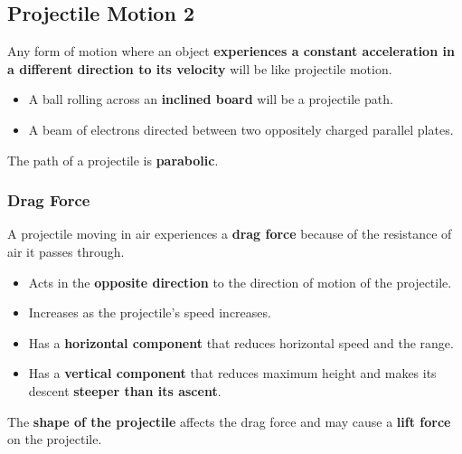 \subsection{Projectile Motion 2}

Any form of motion where an object \textbf{experiences a constant acceleration in a different direction to its velocity} will be like projectile motion.

\begin{itemize}
    \item A ball rolling across an \textbf{inclined board} will be a projectile path.
    \item A beam of electrons directed between two oppositely charged parallel plates.
\end{itemize}

The path of a projectile is \textbf{parabolic}.

\subsubsection*{Drag Force}

A projectile moving in air experiences a \textbf{drag force} because of the resistance of air it passes through.
\begin{itemize}
    \item Acts in the \textbf{opposite direction} to the direction of motion of the projectile.
    \item Increases as the projectile's speed increases.
    \item Has a \textbf{horizontal component} that reduces horizontal speed and the range.
    \item Has a \textbf{vertical component} that reduces maximum height and makes its descent \textbf{steeper than its ascent}.
\end{itemize}

The \textbf{shape of the projectile} affects the drag force and may cause a \textbf{lift force} on the projectile.
